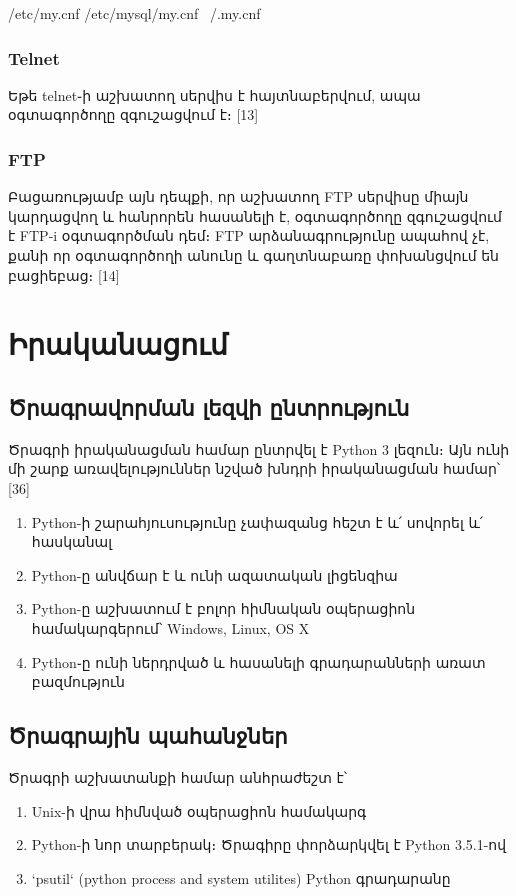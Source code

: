 \documentclass[a4paper,12pt]{article}
\begin{document}
\begin{sloppypar}
    /etc/my.cnf
    /etc/mysql/my.cnf
    ~/.my.cnf

\subsubsection{Telnet}

Եթե telnet֊ի աշխատող սերվիս է հայտնաբերվում, ապա օգտագործողը զգուշացվում է։
[13]

\subsubsection{FTP}

Բացառությամբ այն դեպքի, որ աշխատող FTP սերվիսը միայն կարդացվող և
հանրորեն հասանելի է, օգտագործողը զգուշացվում է FTP-i օգտագործման դեմ։
FTP արձանագրությունը ապահով չէ, քանի որ օգտագործողի անունը և
գաղտնաբառը փոխանցվում են բացիեբաց։ [14]


\section{Իրականացում}


\subsection{Ծրագրավորման լեզվի ընտրություն}


Ծրագրի իրականացման համար ընտրվել է Python 3 լեզուն։
Այն ունի մի շարք առավելություններ նշված խնդրի իրականացման համար՝
[36]
\begin{enumerate}
\item Python-ի շարահյուսությունը չափազանց հեշտ է և՛ սովորել և՛ հասկանալ
\item Python-ը անվճար է և ունի ազատական լիցենզիա
\item Python-ը աշխատում է բոլոր հիմնական օպերացիոն համակարգերում՝ Windows, Linux, OS X
\item Python֊ը ունի ներդրված և հասանելի գրադարանների առատ բազմություն
\end{enumerate}


\subsection{Ծրագրային պահանջներ}

Ծրագրի աշխատանքի համար անհրաժեշտ է՝

\begin{enumerate}
\item Unix-ի վրա հիմնված օպերացիոն համակարգ
\item Python-ի նոր տարբերակ։ Ծրագիրը փորձարկվել է Python 3.5.1-ով
\item `psutil` (python process and system utilites) Python գրադարանը
\end{enumerate}


\end{sloppypar}
\end{document}
